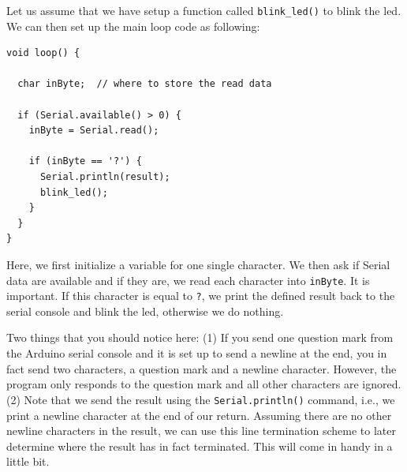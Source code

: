 Let us assume that we have setup a function called \lstinline{blink_led()} to blink the \ac{led}. We can then set up the main loop code as following:
\begin{lstlisting}
void loop() {

  char inByte;  // where to store the read data
  
  if (Serial.available() > 0) {
    inByte = Serial.read();

    if (inByte == '?') {
      Serial.println(result);
      blink_led();
    } 
  }
}
\end{lstlisting}
Here, we first initialize a variable for one single character. We then ask if Serial data are available and if they are, we read each character into \lstinline{inByte}. It is important. If this character is equal to \lstinline{?}, we print the defined result back to the serial console and blink the \ac{led}, otherwise we do nothing. 

Two things that you should notice here: (1) If you send one question mark from the Arduino serial console and it is set up to send a newline at the end, you in fact send two characters, a question mark and a newline character. However, the program only responds to the question mark and all other characters are ignored. (2) Note that we send the result using the \lstinline{Serial.println()} command, i.e., we print a newline character at the end of our return. Assuming there are no other newline characters in the result, we can use this line termination scheme to later determine where the result has in fact terminated. This will come in handy in a little bit.


